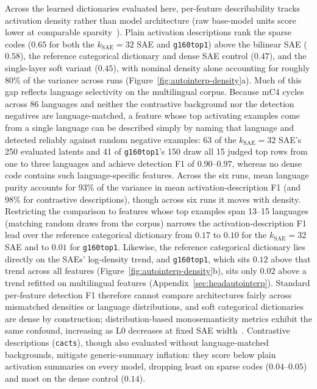 Across the learned dictionaries evaluated here, per-feature describability
tracks activation density rather than model architecture (raw base-model
units score lower at comparable sparsity~\cite{paulo2025}). Plain
activation descriptions rank the sparse codes ($0.65$ for both the
$k_{\mathrm{SAE}}{=}32$ SAE and \texttt{g160top1}) above the bilinear SAE
($0.58$), the reference categorical dictionary and dense SAE control
($0.47$), and the single-layer soft variant ($0.45$), with nominal density
alone accounting for roughly 80\% of the variance across runs
(Figure~\ref{fig:autointerp-density}a). Much of this gap reflects language
selectivity on the multilingual corpus. Because mC4 cycles across 86
languages and neither the contrastive background nor the detection negatives
are language-matched, a feature whose top activating examples come from a
single language can be described simply by naming that language and detected
reliably against random negative examples: 63 of the
$k_{\mathrm{SAE}}{=}32$ SAE's 250 evaluated latents and 41 of
\texttt{g160top1}'s 150 draw all 15 judged top rows from one to three
languages and achieve detection F1 of $0.90$--$0.97$, whereas no dense code
contains such language-specific features. Across the six runs, mean language
purity accounts for 93\% of the variance in mean activation-description F1
(and 98\% for contrastive descriptions), though across six runs it moves
with density.
Restricting the comparison to features whose top examples span 13--15
languages (matching random draws from the corpus) narrows the
activation-description F1 lead over the reference categorical dictionary
from $0.17$ to $0.10$ for the $k_{\mathrm{SAE}}{=}32$ SAE and to $0.01$ for
\texttt{g160top1}. Likewise, the reference categorical dictionary lies
directly on the SAEs' log-density trend, and \texttt{g160top1}, which sits
$0.12$ above that trend across all features
(Figure~\ref{fig:autointerp-density}b), sits only $0.02$ above a trend
refitted on multilingual features
(Appendix~\ref{sec:headautointerp}). Standard per-feature detection F1
therefore cannot compare architectures fairly across mismatched densities or
language distributions, and soft categorical dictionaries are dense by
construction; distribution-based monosemanticity metrics exhibit the same
confound, increasing as $\mathrm{L0}$ decreases at fixed SAE
width~\cite{fereidouni2025evaluatingsparseautoencodersmonosemantic}.
Contrastive descriptions (\texttt{cacts}), though also evaluated without
language-matched backgrounds, mitigate generic-summary inflation: they score
below plain activation summaries on every model, dropping least on sparse
codes ($0.04$--$0.05$) and most on the dense control ($0.14$).

